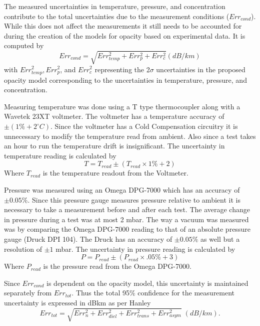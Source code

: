 The measured uncertainties in temperature, pressure, and concentration contribute to the total uncertainties due to the measurement conditions ($Err_{cond}$). While this does not affect the measurements it still needs to be accounted for during the creation of the models for opacity based on experimental data. It is computed by
\begin{equation}
Err_{cond} = \sqrt{Err_{temp}^2 + Err_{p}^2 + Err_{c}^2} (dB/km)
\end{equation}
with $Err_{temp}^2, Err_{p}^2 $, and $ Err_{c}^2$ representing the 2$\sigma$ uncertainties in the proposed opacity model corresponding to the uncertainties in temperature, pressure, and concentration. 

Measuring temperature was done using a T type thermocoupler along with a Wavetek 23XT voltmeter. The voltmeter has a temperature accuracy of $\pm (1\% + 2^\circ C)$. Since the voltmeter has a Cold Compensation circuitry it is unnecessary to modify the temperature read from ambient. Also since a test takes an hour to run the temperature drift is insignificant. The uncertainty in temperature reading is calculated by
\begin{equation}
T = T_{read} \pm ( T_{read} \times 1\% + 2)
\end{equation}
Where $T_{read}$ is the temperature readout from the Voltmeter.

Pressure was measured using an Omega DPG-7000 which has an accuracy of $\pm 0.05\%$. Since this pressure gauge measures pressure relative to ambient it is necessary to take a measurement before and after each test. The average change in pressure during a test was at most 2 mbar. The way a vacuum was measured was by comparing the Omega DPG-7000 reading to that of an absolute pressure gauge (Druck DPI 104). The Druck has an accuracy of $\pm 0.05\%$ as well but a resolution of $\pm 1$ mbar. The uncertainty in pressure reading is calculated by
\begin{equation}
P = P_{read} \pm ( P_{read} \times .05\% + 3)
\end{equation}
Where $P_{read}$ is the pressure read from the Omega DPG-7000.

Since $Err_{cond}$ is dependent on the opacity model, this uncertainty is maintained separately from $Err_{tot}$. Thus the total 95\% confidence for the measurement uncertainty is expressed in dB\/km as per Hanley \cite{Hanley-thesis}
\begin{equation}
Err_{tot} = \sqrt{Err_n^2 + Err_{diel}^2 + Err_{trans}^2 + Err_{asym}^2} \;(dB/km).
\end{equation}